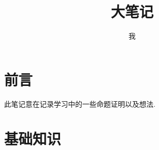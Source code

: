 \documentclass[b5paper]{Btexbook}
\title{大笔记}
\author{我}
\begin{document}
    \coverpage

    \tableofcontents
    \newpage

    \chapter*{前言}
    
    此笔记意在记录学习中的一些命题证明以及想法.

    \chapter{基础知识}
    
    
\end{document}
